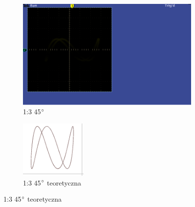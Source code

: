 \begin{itemize}
{    \begin{figure}[H]
        \centering
        \begin{subfigure}[h]{0.45\textwidth}
            \includegraphics[scale=0.3]{images/zad.5.1.png}
            \caption*{1:3 45$\degree$}
        \end{subfigure}
        \begin{subfigure}[h]{0.45\textwidth}
            \includegraphics[scale=1.9]{images/theoretical/1-3-45.png}
            \caption*{1:3 45$\degree$ teoretyczna}
        \end{subfigure}
    \end{figure}
}

\end{itemize}